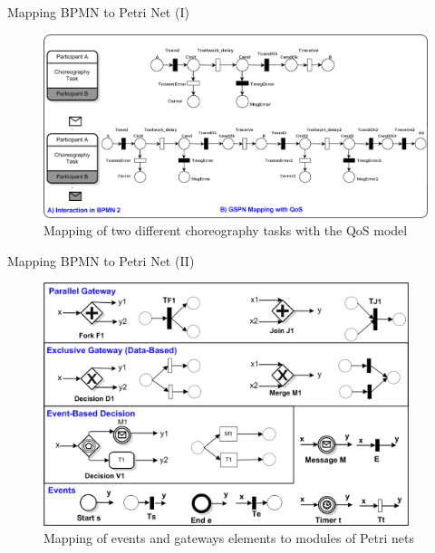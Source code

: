 \documentclass[xcolor=svgnames]{beamer}
\begin{document}
  \begin{frame}{Mapping BPMN to Petri Net (I)}
    \begin{figure}[!h]
      \centering
      \includegraphics[width=1.0\textwidth]{BPMNChoreographies1-QoS.png}
      \caption{  Mapping of two different choreography tasks with the QoS model}
    \end{figure}
  \end{frame}


  \begin{frame}{Mapping BPMN to Petri Net (II)}
    \begin{figure}[!h]
	\centering
	\includegraphics[width=0.95\textwidth]{BPMNChoreographies2_2.png}
	\caption{Mapping of events and gateways elements to modules of Petri nets}
     \end{figure}
  \end{frame}
\end{document}
